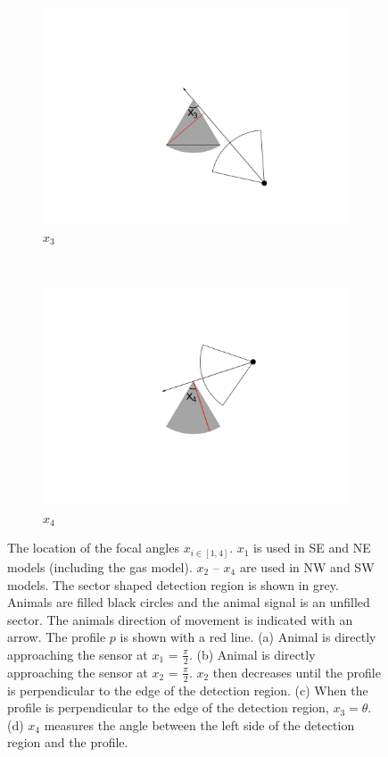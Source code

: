 \begin{figure}[t]
\begin{subfigure}[t]{0.22\textwidth}
                \centering
        \includegraphics[width=1\textwidth, trim=9cm 2cm 9cm 2cm]{imgs/x3.pdf}
                \caption{$x_3$}               
                \label{f:x3}
        \end{subfigure}%
	~
	\begin{subfigure}[t]{0.22\textwidth}
                \centering
        \includegraphics[width=1\textwidth, trim=9cm 2cm 9cm 2cm]{imgs/x4.pdf}
                \caption{$x_4$}               
                \label{f:x4}
        \end{subfigure}%
\caption[The location of the focal angles $x_{i\in[1,4]}$]{The location of the focal angles $x_{i\in[1,4]}$. $x_1$ is used in SE and NE models (including the gas model). $x_2$ -- $x_4$ are used in NW and SW models. The sector shaped detection region is shown in grey. Animals are filled black circles and the animal signal is an unfilled sector. The animals direction of movement is indicated with an arrow. The profile $p$ is shown with a red line. (a) Animal is directly approaching the sensor at $x_1$ = $\frac{\pi}{2}$. (b) Animal is directly approaching the sensor at $x_2$ = $\frac{\pi}{2}$. $x_2$ then decreases until the profile is perpendicular to the edge of the detection region. (c) When the profile is perpendicular to the edge of the detection region, $x_3 = \theta$. (d) $x_4$ measures the angle between the left side of the detection region and the profile.}


\end{figure}
